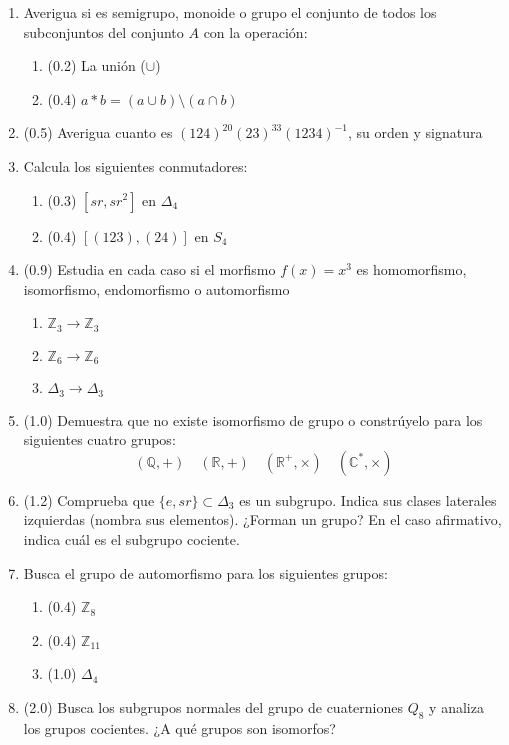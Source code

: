 \documentclass[a4paper,12pt]{article}
\begin{document}
\begin{enumerate}
    \item Averigua si es semigrupo, monoide o grupo el conjunto de todos los subconjuntos del conjunto $A$ con la operación:

    \begin{enumerate}
        \item (0.2) La unión ($\cup$)
        \item (0.4) $a*b = (a \cup b) \setminus (a \cap b)$
    \end{enumerate}

    \item (0.5) Averigua cuanto es $(124)^{20} (23)^{33} (1234)^{-1}$, su orden y signatura

    \item Calcula los siguientes conmutadores:

    \begin{enumerate}
        \item (0.3) $[sr, sr^2]$ en $\Delta_{4}$
        \item (0.4) $[(123),(24)]$ en $S_{4}$
    \end{enumerate}

    \item (0.9) Estudia en cada caso si el morfismo $f(x) = x^3$ es homomorfismo, isomorfismo, endomorfismo o automorfismo

    \begin{enumerate}
        \item $\mathbb{Z}_3 \to \mathbb{Z}_3$
        \item $\mathbb{Z}_6 \to \mathbb{Z}_6$
        \item $\Delta_{3} \to \Delta_{3}$
    \end{enumerate}

    \item (1.0) Demuestra que no existe isomorfismo de grupo o constrúyelo para los siguientes cuatro grupos:
        $$
        (\mathbb{Q}, +) \quad (\mathbb{R}, +) \quad (\mathbb{R}^{+}, \times) \quad (\mathbb{C}^{*}, \times)
        $$

    \item (1.2) Comprueba que $\{e, sr\} \subset \Delta_{3}$ es un subgrupo. Indica sus clases laterales izquierdas (nombra sus elementos). ¿Forman un grupo? En el caso afirmativo, indica cuál es el subgrupo cociente.

    \item Busca el grupo de automorfismo para los siguientes grupos:

    \begin{enumerate}
        \item (0.4) $\mathbb{Z}_8$
        \item (0.4) $\mathbb{Z}_{11}$
        \item (1.0) $\Delta_{4}$
    \end{enumerate}

\item (2.0) Busca los subgrupos normales del grupo de cuaterniones $Q_8$ y analiza los grupos cocientes. ¿A qué grupos son isomorfos?

\end{enumerate}
\end{document}
